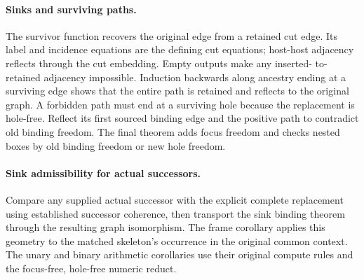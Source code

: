 \paragraph{Sinks and surviving paths.}
The survivor function recovers the original edge from a retained cut edge.
Its label and incidence equations are the defining cut equations; host-host
adjacency reflects through the cut embedding. Empty outputs make any inserted-
to-retained adjacency impossible. Induction backwards along ancestry ending
at a surviving edge shows that the entire path is retained and reflects to
the original graph. A forbidden path must end at a surviving hole because the
replacement is hole-free. Reflect its first sourced binding edge and the
positive path to contradict old binding freedom. The final theorem adds focus
freedom and checks nested boxes by old binding freedom or new hole freedom.

\par{}

\paragraph{Sink admissibility for actual successors.}
Compare any supplied actual successor with the explicit complete replacement
using established successor coherence, then transport the sink binding theorem
through the resulting graph isomorphism. The frame corollary applies this
geometry to the matched skeleton's occurrence in the original common context.
The unary and binary arithmetic corollaries use their original compute rules
and the focus-free, hole-free numeric reduct.


